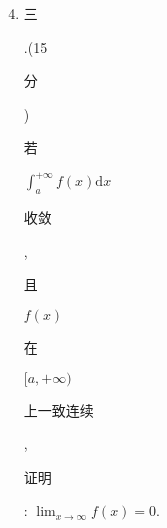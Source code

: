 \documentclass[10pt]{article}
\begin{document}
\begin{enumerate}
  \setcounter{enumi}{3}
  \item \begin{CJK}{UTF8}{mj}三\end{CJK}.(15 \begin{CJK}{UTF8}{mj}分\end{CJK}) \begin{CJK}{UTF8}{mj}若\end{CJK} $\int_{a}^{+\infty} f(x) \mathrm{d} x$ \begin{CJK}{UTF8}{mj}收敛\end{CJK}, \begin{CJK}{UTF8}{mj}且\end{CJK} $f(x)$ \begin{CJK}{UTF8}{mj}在\end{CJK} $[a,+\infty)$ \begin{CJK}{UTF8}{mj}上一致连续\end{CJK}, \begin{CJK}{UTF8}{mj}证明\end{CJK}: $\lim _{x \rightarrow \infty} f(x)=0$.


\end{enumerate}
\end{document}
